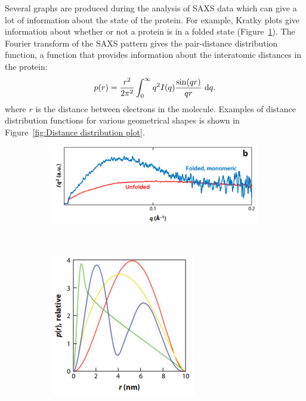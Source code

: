     Several graphs are produced during the analysis of SAXS data which can give a lot of information about the state of the protein. For example, Kratky plots give information about whether or not a protein is in a folded state (Figure~\ref{fig:Kratky plot}). The Fourier transform of the SAXS pattern gives the pair-distance distribution function, a function that provides information about the interatomic distances in the protein:
    \begin{equation}
        p(r) = \f{r^2}{2\pi^2}\int_0^{\infty}q^2 I(q) \f{\sin(qr)}{qr}\ \mathrm{d}q.
    \end{equation}
    where $r$ is the distance between electrons in the molecule.
    Examples of distance distribution functions for various geometrical shapes is shown in Figure~\ref{fig:Distance distribution plot}.
    \begin{figure}
        \centering
        \begin{subfigure}[b]{0.8\textwidth}
                \centering
                \includegraphics[width=\textwidth]{figures/introduction/kratkyplot.png}
                \caption{}
                \label{fig:Kratky plot}
        \end{subfigure}
        \\
        \begin{subfigure}[b]{0.4\textwidth}
                \centering
                \includegraphics[width=\textwidth]{figures/introduction/distancedistribution.png}

\end{subfigure}
\end{figure}
